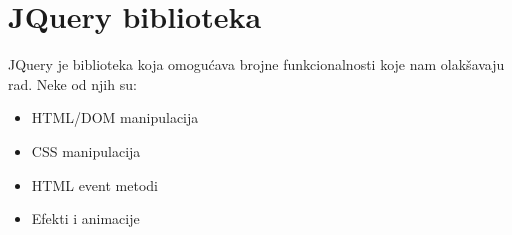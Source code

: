 \section{JQuery biblioteka}

JQuery je biblioteka koja omogućava brojne funkcionalnosti koje nam olakšavaju rad. Neke od njih su:
\begin{itemize}
\item HTML/DOM manipulacija
\item CSS manipulacija
\item HTML event metodi
\item Efekti i animacije
\end{itemize} 






